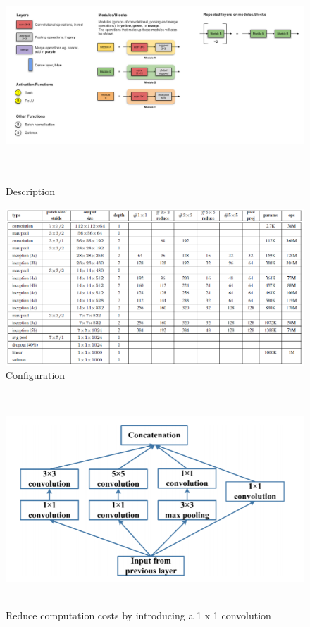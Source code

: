 \documentclass[12pt]{report}
\begin{document}
	\begin{figure}[h]
		\begin{center}
			\includegraphics[width=\textwidth,height=8cm]{B.png}\caption{Description}\label{fig:B}
		\end{center}
	\end{figure}
	\newpage
	\begin{figure}[h]
		\includegraphics[width=\textwidth]{C.png}\caption{Configuration}\label{fig:C}
	\end{figure}
	\begin{figure}[h]
	\includegraphics[width=\textwidth,height=8cm]{inception.png}\caption{Reduce computation costs by introducing a 1 x 1 convolution}\label{fig:inception}
	\end{figure}			
\end{document}
